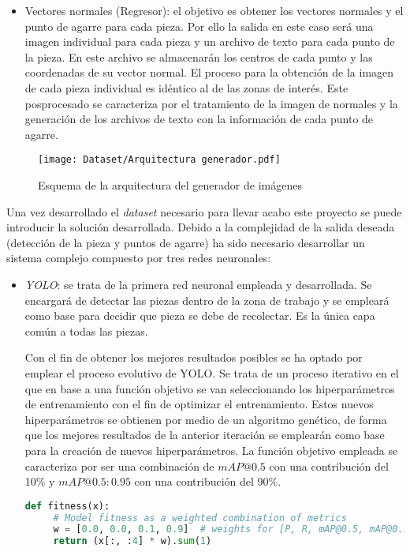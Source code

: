 {\begin{itemize}
\item Vectores normales (Regresor): el objetivo es obtener los vectores normales y el punto de agarre para cada pieza. Por ello la salida en este caso será una imagen individual para cada pieza y un archivo de texto para cada punto de la pieza. En este archivo se almacenarán los centros de cada punto y las coordenadas de su vector normal. El proceso para la obtención de la imagen de cada pieza individual es idéntico al de las zonas de interés. Este posprocesado se caracteriza por el tratamiento de la imagen de normales y la generación de los archivos de texto con la información de cada punto de agarre.
\end{itemize}

\begin{figure}[ht]
	\centering
	\texttt{[image: Dataset/Arquitectura generador.pdf]}
	\caption{Esquema de la arquitectura del generador de imágenes}
	\label{chap:Resumen fig:Arquitectura generador}
	\vspace{-5pt}
\end{figure}

Una vez desarrollado el \textit{dataset} necesario para llevar acabo este proyecto se puede introducir la solución desarrollada. Debido a la complejidad de la salida deseada (detección de la pieza y puntos de agarre) ha sido necesario desarrollar un sistema complejo compuesto por tres redes neuronales:

\begin{itemize}
\item \textit{YOLO}: se trata de la primera red neuronal empleada y desarrollada. Se encargará de detectar las piezas dentro de la zona de trabajo y se empleará como base para decidir que pieza se debe de recolectar. Es la única capa común a todas las piezas.

Con el fin de obtener los mejores resultados posibles se ha optado por emplear el proceso evolutivo de YOLO. Se trata de un proceso iterativo en el que en base a una función objetivo se van seleccionando los hiperparámetros de entrenamiento con el fin de optimizar el entrenamiento. Estos nuevos hiperparámetros se obtienen por medio de un algoritmo genético, de forma que los mejores resultados de la anterior iteración se emplearán como base para la creación de nuevos hiperparámetros. La función objetivo empleada se caracteriza por ser una combinación de $mAP@0.5$ con una contribución del 10\% y $mAP@0.5:0.95$ con una contribución del 90\%.

\begin{lstlisting}[language=Python]
 def fitness(x): 
     # Model fitness as a weighted combination of metrics 
     w = [0.0, 0.0, 0.1, 0.9]  # weights for [P, R, mAP@0.5, mAP@0.5:0.95] 
     return (x[:, :4] * w).sum(1) 
\end{lstlisting}


\end{itemize}}
